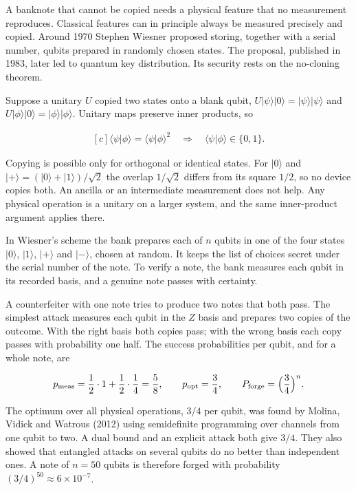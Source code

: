 \documentclass[11pt,oneside]{book}
\newenvironment{centeredalign}{\[\begin{gathered}[c]}{\end{gathered}\]}
\begin{document}
\label{topic:quantum-cryptography}

A banknote that cannot be copied needs a physical feature that no measurement reproduces. Classical features can in principle always be measured precisely and copied. Around 1970 Stephen Wiesner proposed storing, together with a serial number, qubits prepared in randomly chosen states. The proposal, published in 1983, later led to quantum key distribution. Its security rests on the no-cloning theorem.

Suppose a unitary \(U\) copied two states onto a blank qubit, \(U|\psi\rangle|0\rangle=|\psi\rangle|\psi\rangle\) and \(U|\phi\rangle|0\rangle=|\phi\rangle|\phi\rangle\). Unitary maps preserve inner products, so

\begin{centeredalign}
\langle\psi|\phi\rangle=\langle\psi|\phi\rangle^2\quad\Longrightarrow\quad
\langle\psi|\phi\rangle\in\{0,1\}.
\end{centeredalign}

Copying is possible only for orthogonal or identical states. For \(|0\rangle\) and \(|+\rangle=(|0\rangle+|1\rangle)/\sqrt2\) the overlap \(1/\sqrt2\) differs from its square \(1/2\), so no device copies both. An ancilla or an intermediate measurement does not help. Any physical operation is a unitary on a larger system, and the same inner-product argument applies there.

In Wiesner's scheme the bank prepares each of \(n\) qubits in one of the four states \(|0\rangle\), \(|1\rangle\), \(|+\rangle\) and \(|-\rangle\), chosen at random. It keeps the list of choices secret under the serial number of the note. To verify a note, the bank measures each qubit in its recorded basis, and a genuine note passes with certainty.

A counterfeiter with one note tries to produce two notes that both pass. The simplest attack measures each qubit in the \(Z\) basis and prepares two copies of the outcome. With the right basis both copies pass; with the wrong basis each copy passes with probability one half. The success probabilities per qubit, and for a whole note, are

\begin{centeredalign}
p_{\rm meas}=\frac12\cdot1+\frac12\cdot\frac14=\frac58,\qquad p_{\rm opt}=\frac34,\qquad
P_{\rm forge}=\Big(\frac34\Big)^n.
\end{centeredalign}

The optimum over all physical operations, \(3/4\) per qubit, was found by Molina, Vidick and Watrous (2012) using semidefinite programming over channels from one qubit to two. A dual bound and an explicit attack both give \(3/4\). They also showed that entangled attacks on several qubits do no better than independent ones. A note of \(n=50\) qubits is therefore forged with probability \((3/4)^{50}\approx6\times10^{-7}\).
\end{document}
